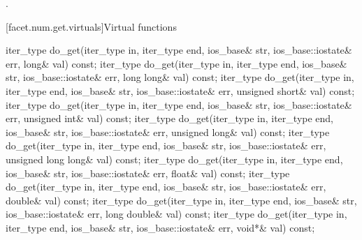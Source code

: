 \begin{itemdescr}
\pnum
\returns
{}.
\end{itemdescr}

[facet.num.get.virtuals]{Virtual functions}

%
\begin{itemdecl}
iter_type do_get(iter_type in, iter_type end, ios_base& str,
                 ios_base::iostate& err, long& val) const;
iter_type do_get(iter_type in, iter_type end, ios_base& str,
                 ios_base::iostate& err, long long& val) const;
iter_type do_get(iter_type in, iter_type end, ios_base& str,
                 ios_base::iostate& err, unsigned short& val) const;
iter_type do_get(iter_type in, iter_type end, ios_base& str,
                 ios_base::iostate& err, unsigned int& val) const;
iter_type do_get(iter_type in, iter_type end, ios_base& str,
                 ios_base::iostate& err, unsigned long& val) const;
iter_type do_get(iter_type in, iter_type end, ios_base& str,
                 ios_base::iostate& err, unsigned long long& val) const;
iter_type do_get(iter_type in, iter_type end, ios_base& str,
                 ios_base::iostate& err, float& val) const;
iter_type do_get(iter_type in, iter_type end, ios_base& str,
                 ios_base::iostate& err, double& val) const;
iter_type do_get(iter_type in, iter_type end, ios_base& str,
                 ios_base::iostate& err, long double& val) const;
iter_type do_get(iter_type in, iter_type end, ios_base& str,
                 ios_base::iostate& err, void*& val) const;
\end{itemdecl}

